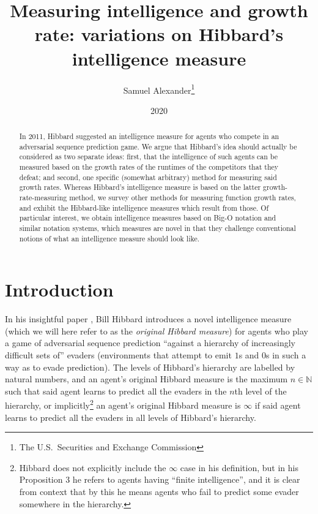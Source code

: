\documentclass{article}
\title{Measuring intelligence and growth rate: variations on
Hibbard's intelligence measure}
\author{Samuel Alexander\thanks{The U.S.\ Securities and Exchange Commission}}
\date{2020}
\begin{document}
\maketitle

\begin{abstract}
    In 2011, Hibbard suggested an intelligence measure for agents
    who compete in an adversarial sequence prediction game. We argue
    that Hibbard's idea should actually be considered as two separate
    ideas: first, that the intelligence of such agents can be measured
    based on the growth rates of the runtimes of the competitors that
    they defeat; and second, one specific (somewhat arbitrary) method for measuring said
    growth rates. Whereas Hibbard's intelligence measure is based on the latter
    growth-rate-measuring method, we survey
    other methods for measuring function
    growth rates, and exhibit the Hibbard-like intelligence measures
    which result from those. Of particular interest, we obtain intelligence measures
    based on Big-O notation and similar notation systems, which measures
    are novel in that they challenge conventional notions of what an
    intelligence measure should look like.
\end{abstract}

\section{Introduction}

In his insightful paper \cite{hibbard}, Bill Hibbard introduces a novel
intelligence measure (which we will here refer to as the \emph{original Hibbard measure})
for agents who play a game of adversarial sequence prediction
\cite{hibbard2008adversarial}
``against a hierarchy of increasingly difficult sets of'' evaders (environments that attempt
to emit $1$s and $0$s in such a way as to evade prediction).
The levels of Hibbard's hierarchy are labelled by natural numbers, and
an agent's original Hibbard measure is the maximum $n\in\mathbb N$ such that
said agent learns to predict all the evaders in the $n$th level of the hierarchy,
or implicitly\footnote{Hibbard does not explicitly include the $\infty$ case in his
definition, but in his Proposition 3 he refers to agents having ``finite intelligence'', and
it is clear from context that by this he means agents who fail to predict some evader
somewhere in the hierarchy.} an agent's original Hibbard measure is $\infty$
if said agent learns to predict all the evaders in all levels of Hibbard's hierarchy.
\end{document}
